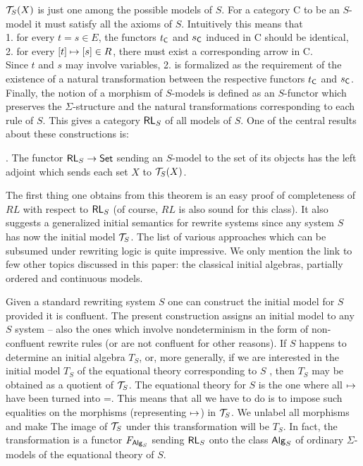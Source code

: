 {
${\cal T}_{S}(X)$ is just one among the possible models of $S$. For a 
category {\sf C} to be an $S$-model it must satisfy all the 
axioms of $S$. Intuitively this means that \\[.5ex]
\hspace*{2em}1. for every $t=s \in E$, the functors $t_{\sf C}$ and $s_{\sf C}$ induced 
in {\sf C} should be identical, \\
\hspace*{2em}2.  for every $[t] \mathrel{\mapsto} [s] \in R$, there must exist a corresponding arrow 
in {\sf C}. \\[.5ex]
Since $t$ and $s$ may involve variables, 2. is formalized as the requirement of the existence of a natural 
transformation between the respective functors $t_{\sf C}$ and $s_{\sf C}$. 
Finally, the notion of a morphism of $S$-models is 
defined as an $S$-functor which preserves the $\Sigma$-structure and the natural transformations corresponding to 
each rule of $S$. This gives a category ${\sf RL}_S$ of all models 
of $S$. One of the central results about these 
constructions is:
\begin{Theorem}{\rm \cite{c:87}.} 
The functor ${\sf RL}_S\mathrel{\rightarrow} {\sf Set}$ sending an $S$-model to the set 
of its objects has the 
left adjoint which sends each set $X$ to ${\cal T}_{S}(X)$.     
\end{Theorem}
The first thing one obtains from this theorem is an easy proof of
completeness of $RL$ with respect to ${\sf RL}_S$ (of course, $RL$ is
also sound for this class).  It also suggests a generalized initial
semantics for rewrite systems since any system $S$ has now the initial
model ${\cal T}_{S}$.  The list of various approaches which can be subsumed
under rewriting logic is quite impressive. We only mention the link to
few other topics discussed in this paper: the classical initial algebras,
partially ordered and continuous models.

Given a standard rewriting system $S$ one can construct the initial model 
for $S$ provided it is confluent. 
The present construction assigns an initial model to any $S$ 
system -- also the ones which involve 
nondeterminism in the form of non-confluent rewrite rules (or are not confluent 
for other reasons). If $S$ 
happens to determine an initial algebra $T_{S}$, or, more generally, if we are interested in the initial 
model $T_{S}$ 
of the equational theory corresponding to $S$ , then $T_{S}$ may be obtained 
as a quotient of ${\cal T}_{S}$. The equational 
theory for $S$ is the one where all $\mathrel{\mapsto}$ have been turned into =. This means that all we have to do is to impose 
such equalities on the morphisms (representing $\mathrel{\mapsto}$) in ${\cal T}_{S}$. We unlabel 
all morphisms and make 
The image of ${\cal T}_{S}$ under this transformation will be $T_{S}$. In fact, the 
transformation is a functor $F_{{\sf Alg}_{S}}$ sending ${\sf RL}_S$ onto the 
class ${\sf Alg}_S$ of ordinary $\Sigma$-models of the 
equational theory of $S$.

}
